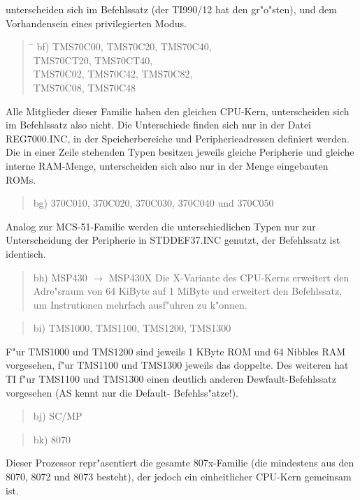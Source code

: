 \documentclass[12pt,a4paper,twoside]{report}
\begin{document}
unterscheiden sich im Befehlssatz (der TI990/12 hat den gr"o"sten), und
dem Vorhandensein eines privilegierten Modus.
\begin{quote}
\begin{tabbing}
\hspace{0.7cm} \= \kill
bf) \> TMS70C00, TMS70C20, TMS70C40, \\
    \> TMS70CT20, TMS70CT40, \\
    \> TMS70C02, TMS70C42, TMS70C82, \\
    \> TMS70C08, TMS70C48 \\
\end{tabbing}
\end{quote}
Alle Mitglieder dieser Familie haben den gleichen CPU-Kern,
unterscheiden sich im Befehlssatz also nicht.  Die Unterschiede
finden sich nur in der Datei REG7000.INC, in der Speicherbereiche
und Peripherieadressen definiert werden.  Die in einer Zeile
stehenden  Typen besitzen jeweils gleiche Peripherie und gleiche
interne RAM-Menge, unterscheiden sich also nur in der Menge
eingebauten ROMs.
\begin{quote}
bg) 370C010, 370C020, 370C030, 370C040 und 370C050
\end{quote}
Analog zur MCS-51-Familie werden die unterschiedlichen Typen nur
zur Unterscheidung der Peripherie in STDDEF37.INC genutzt, der
Befehlssatz ist identisch.
\begin{quote}
bh) MSP430 $\rightarrow$ MSP430X
Die X-Variante des CPU-Kerns erweitert den Adre"sraum von 64
KiByte auf 1 MiByte und erweitert den Befehlssatz, um
Instrutionen mehrfach ausf"uhren zu k"onnen.
\end{quote}
\begin{quote}
bi) TMS1000, TMS1100, TMS1200, TMS1300
\end{quote}
F"ur TMS1000 und TMS1200 sind jeweils 1 KByte ROM und 64 Nibbles
RAM vorgesehen, f"ur TMS1100 und TMS1300 jeweils das doppelte.  Des
weiteren hat TI f"ur TMS1100 und TMS1300 einen deutlich anderen
Dewfault-Befehlssatz vorgesehen (AS kennt nur die Default-
Befehlss"atze!).
\begin{quote}
bj) SC/MP
\end{quote}
\begin{quote}
bk) 8070
\end{quote}
Dieser Prozessor repr"asentiert die gesamte 807x-Familie (die mindestens
aus den 8070, 8072 und 8073 besteht), der jedoch ein einheitlicher
CPU-Kern gemeinsam ist.
\end{document}
